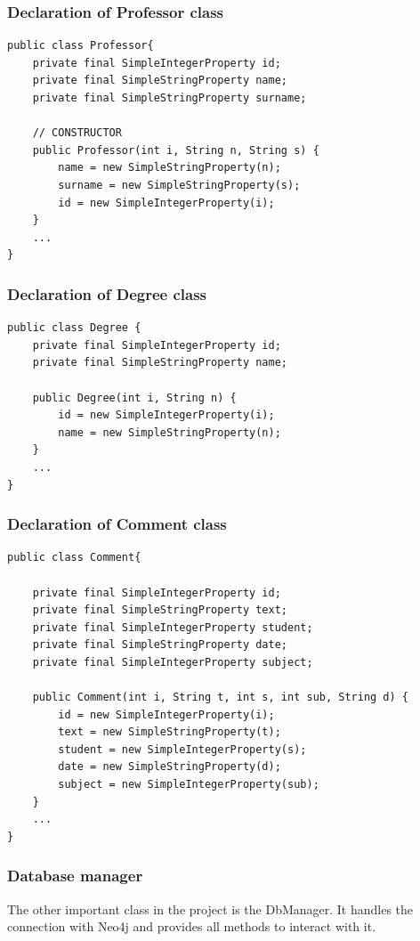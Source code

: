 \documentclass[a4paper]{article}
\begin{document}
\subsubsection{Declaration of Professor class}
\begin{verbatim}
public class Professor{
    private final SimpleIntegerProperty id;
    private final SimpleStringProperty name;
    private final SimpleStringProperty surname;
	
    // CONSTRUCTOR
    public Professor(int i, String n, String s) {
        name = new SimpleStringProperty(n);
        surname = new SimpleStringProperty(s);
        id = new SimpleIntegerProperty(i);
    }
	...
}
\end{verbatim}

\subsubsection{Declaration of Degree class}
\begin{verbatim}
public class Degree {
    private final SimpleIntegerProperty id;
    private final SimpleStringProperty name;
    
    public Degree(int i, String n) {
        id = new SimpleIntegerProperty(i);
        name = new SimpleStringProperty(n);
    }
    ...
}
\end{verbatim}

\subsubsection{Declaration of Comment class}
\begin{verbatim}
public class Comment{

    private final SimpleIntegerProperty id;
    private final SimpleStringProperty text;
    private final SimpleIntegerProperty student;
    private final SimpleStringProperty date;
    private final SimpleIntegerProperty subject;

    public Comment(int i, String t, int s, int sub, String d) {
        id = new SimpleIntegerProperty(i);
        text = new SimpleStringProperty(t);
        student = new SimpleIntegerProperty(s);
        date = new SimpleStringProperty(d);
        subject = new SimpleIntegerProperty(sub);
    }
	...
}
\end{verbatim}

\subsubsection{Database manager}
The other important class in the project is the DbManager. It handles the connection with Neo4j and provides all methods to interact with it.
\end{document}
